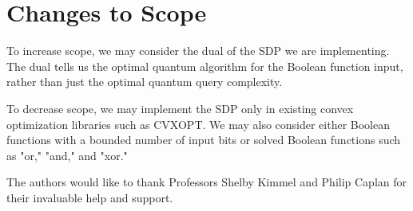\section{Changes to Scope}

To increase scope, we may consider the dual of the SDP
we are implementing.
The dual tells us the optimal quantum algorithm for the Boolean
function input, rather than just the optimal quantum query complexity.

To decrease scope, we may implement the SDP only in existing
convex optimization libraries such as CVXOPT.
We may also consider either Boolean functions with a bounded
number of input bits or solved Boolean functions such as "or,"
"and," and "xor."

\begin{acks}
The authors would like to thank Professors Shelby Kimmel
and Philip Caplan for their invaluable help and support. 
\end{acks}